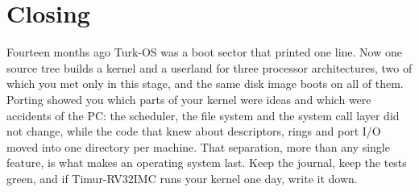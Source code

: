 \documentclass[11pt,a4paper]{article}
\begin{document}
\section{Closing}

Fourteen months ago Turk-OS was a boot sector that printed one line. Now one source tree builds a kernel and a
userland for three processor architectures, two of which you met only in this stage, and the same disk image boots
on all of them. Porting showed you which parts of your kernel were ideas and which were accidents of the PC: the
scheduler, the file system and the system call layer did not change, while the code that knew about descriptors,
rings and port I/O moved into one directory per machine. That separation, more than any single feature, is what makes
an operating system last. Keep the journal, keep the tests green, and if Timur-RV32IMC runs your kernel one day,
write it down.

\booklegend
\portlegend
\end{document}
